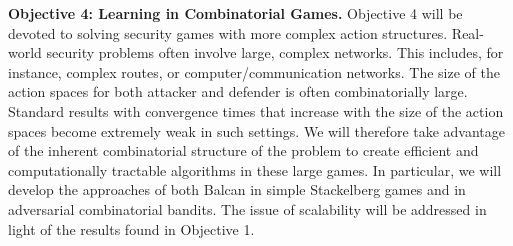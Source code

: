 \textbf{Objective 4:  Learning in Combinatorial Games.}
Objective 4 will be devoted to solving security games with more complex action structures. 
Real-world security problems often involve large, complex networks. This includes, for instance, complex routes, or computer/communication networks. The size of the action spaces for both attacker and defender is often combinatorially large.  Standard results with convergence times that increase with the size of the action spaces become extremely weak in such settings.
We will therefore take advantage of the inherent combinatorial structure of the problem to create efficient and computationally tractable algorithms in these large games.   In particular, we will develop the approaches of both Balcan in simple Stackelberg games and  in adversarial combinatorial bandits\cite{Balcan15CR,cesa2012combinatorial}.
The issue of scalability will be addressed in light of the results found in Objective 1.

